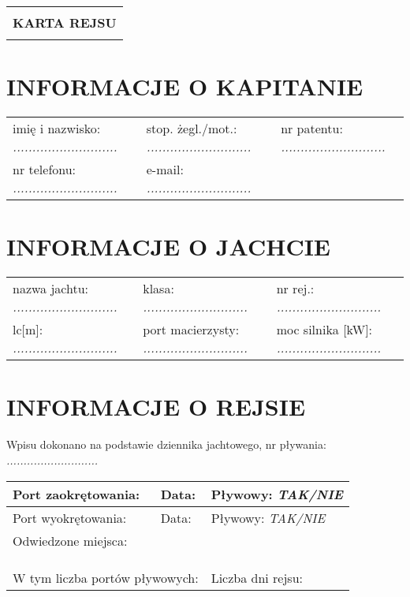 \documentclass{article}
\author{Andrzej Gwiazda}
\begin{document}
\newpage
\begin{tabularx}{\textwidth} { 
  | >{\centering\arraybackslash}X | }
 \hline
 \\
 \textbf{\huge KARTA REJSU} \\
 \\
\hline
\end{tabularx}

\section*{INFORMACJE O KAPITANIE}
\begin{tabularx}{\textwidth}{X X X}
imię i nazwisko: \textit{...........................} & stop. żegl./mot.: \textit{...........................} & nr patentu: \textit{...........................} \\
nr telefonu: \textit{...........................} & e-mail: \textit{...........................} \\
\end{tabularx}

\section*{INFORMACJE O JACHCIE}

\begin{tabularx}{\textwidth}{X X X}
nazwa jachtu: \textit{...........................} & klasa: \textit{...........................} & nr rej.: \textit{...........................} \\
lc[m]: \textit{...........................} & port macierzysty: \textit{...........................} & moc silnika [kW]: \textit{...........................} \\
\end{tabularx}

\section*{INFORMACJE O REJSIE}

Wpisu dokonano na podstawie dziennika jachtowego, nr pływania: \textit{...........................}
\\

\begin{tabularx}{\textwidth}{|X|X|X|}
\hline
Port zaokrętowania: \textit{} & Data: \textit{} & Pływowy: \textit{TAK/NIE} \\
\hline
Port wyokrętowania: \textit{} & Data: \textit{} & Pływowy: \textit{TAK/NIE} \\
\hline
\multicolumn{3}{|l|}{Odwiedzone miejsca:
\dotfill} \\
\multicolumn{3}{|l|}{\dotfill} \\
\multicolumn{3}{|l|}{\dotfill} \\
\multicolumn{3}{|l|}{\dotfill} \\

\hline
\multicolumn{2}{|l|}{W tym liczba portów pływowych: \textit{}} & Liczba dni rejsu: \textit{}\\
\hline
\end{tabularx}
\\\\
\end{document}
